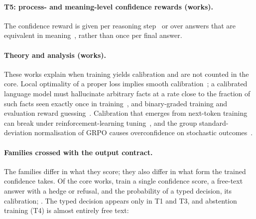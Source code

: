 \paragraph{T5: process- and meaning-level confidence rewards (\nTFive works).} The confidence reward is
given per reasoning step~\citep{he2025mmboundary,wang2026process} or over answers that are equivalent in
meaning~\citep{an2025teaching,yu2026calibrating}, rather than once per final answer.

\paragraph{Theory and analysis (\nTheory works).} These works explain when training yields calibration
and are not counted in the core. Local optimality of a proper loss implies smooth
calibration~\citep{blasiok2023when}; a calibrated language model must hallucinate arbitrary facts at a rate close to the
fraction of such facts seen exactly once in training~\citep{kalai2023calibrated}, and binary-graded training and evaluation
reward guessing~\citep{kalai2025why}. Calibration that emerges from next-token training can break under
reinforcement-learning tuning~\citep{nakkiran2025trained}, and the group standard-deviation
normalisation of GRPO causes overconfidence on stochastic outcomes~\citep{bereket2025uncalibrated}.

\paragraph{Families crossed with the output contract.} The families differ in what they score; they
also differ in what form the trained confidence takes. Of the \nCore core works, \nCoreScore train a
single confidence score, \nCoreFree a free-text answer with a hedge or refusal, and \nCoreTyped the
probability of a typed decision, \coreTypedCalPhrase{} its calibration; \coreOtherPhrase{}. The typed decision appears only in T1 and T3, and abstention training (T4)
is almost entirely free text:

